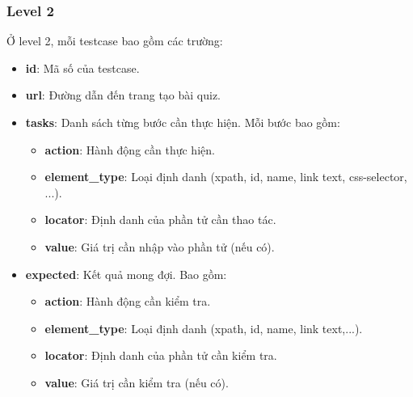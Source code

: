 \subsubsection{Level 2}
Ở level 2, mỗi testcase bao gồm các trường:
\begin{itemize}
    \item \textbf{id}: Mã số của testcase.
    \item \textbf{url}: Đường dẫn đến trang tạo bài quiz.
    \item \textbf{tasks}: Danh sách từng bước cần thực hiện. Mỗi bước bao gồm:
\begin{itemize}
    \item \textbf{action}: Hành động cần thực hiện.
    \item \textbf{element\_type}: Loại định danh (xpath, id, name, link text, css-selector, ...).
    \item \textbf{locator}: Định danh của phần tử cần thao tác.
    \item \textbf{value}: Giá trị cần nhập vào phần tử (nếu có).
\end{itemize}
    \item \textbf{expected}: Kết quả mong đợi. Bao gồm:
\begin{itemize}
    \item \textbf{action}: Hành động cần kiểm tra.
    \item \textbf{element\_type}: Loại định danh (xpath, id, name, link text,...).
    \item \textbf{locator}: Định danh của phần tử cần kiểm tra.
    \item \textbf{value}: Giá trị cần kiểm tra (nếu có).
\end{itemize}
\end{itemize}

